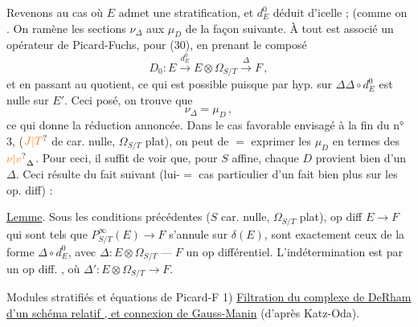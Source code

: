 Revenons au cas où $E$ admet une stratification,  et  $d^0_E$ déduit d'icelle ;   (comme on   .  On ramène les sections $\nu_\Delta$ aux $\mu_D$ de la façon suivante. À tout \deleted{\unsure{$\nu_\Delta$}} \inserted{$\Delta$} est associé un opérateur de Picard-Fuchs,  pour (30), en prenant le composé
\[
 D_0:E\xrightarrow{d^0_E}E\otimes\Omega_{S/T}\xrightarrow{\Delta}F \,, \tag*{(47)}
\]
et en passant au quotient,   ce qui est possible puisque par hyp. sur $\Delta$\quad $\Delta\circ d^0_E$ est nulle sur $E'$. Ceci posé, on trouve que
\[
 \nu_\Delta=\mu_D \,, \tag*{(48)}
\]
ce qui donne la réduction annoncée.
Dans le cas favorable envisagé à la fin du n° 3, ($\unsure{J|T}$ de car. nulle, $\Omega_{S/T}$ plat), on peut de $=$ exprimer les $\mu_D$ en termes des $\unsure{\nu|v}_\Delta$. Pour ceci, il suffit de voir que, pour $S$ affine, chaque $D$ provient bien d'un $\Delta$. Ceci résulte du fait suivant (lui-$=$ cas particulier d'un fait bien plus  sur les op. diff) : 

\uline{Lemme}. Sous les conditions précédentes ($S$ car. nulle, $\Omega_{S/T}$ plat),   op diff $E\longrightarrow F$ qui sont tels que $P^\infty_{S/T}(E)\longrightarrow F$ s'annule sur $\delta(E)$, sont exactement ceux  de la forme $\Delta\circ d^0_E$, avec $\Delta:E\otimes\Omega_{S/T}\mathrel{\text{---}}F$ un op différentiel. L'indétermination est   par un op diff.  , où $\Delta':E\otimes\Omega_{S/T}\longrightarrow F$.

Modules stratifiés et  équations de Picard-F
1) \uline{Filtration du complexe de DeRham d'un schéma relatif , et connexion de Gauss-Manin}  (d'après Katz-Oda).

